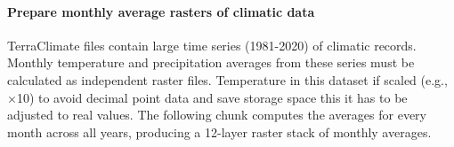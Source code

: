 \documentclass[
  10pt,
  b5paper,
  oneside]{book}
\begin{document}
\paragraph*{Prepare monthly average rasters of climatic data}\label{prepare-monthly-average-rasters-of-climatic-data}

TerraClimate files contain large time series (1981-2020) of climatic records. Monthly temperature and precipitation averages from these series must be calculated as independent raster files. Temperature in this dataset if scaled (e.g., ×10) to avoid decimal point data and save storage space this it has to be adjusted to real values. The following chunk computes the averages for every month across all years, producing a 12-layer raster stack of monthly averages.
\end{document}
